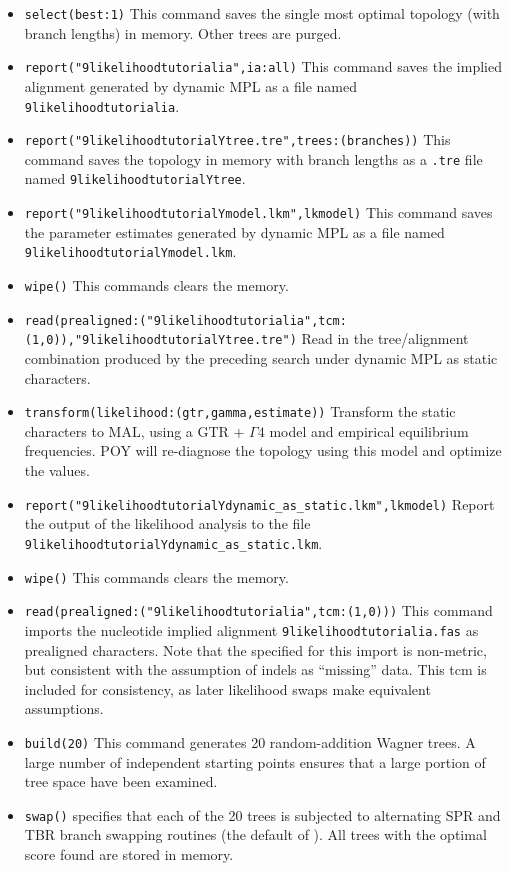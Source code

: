 \begin{itemize}
\item \texttt{select(best:1)} This command saves the single most optimal topology (with branch lengths) in memory. Other trees are purged.
\item \texttt{report("9likelihoodtutorialia",ia:all)} This command saves the implied alignment generated by dynamic MPL as a file named \texttt{9likelihoodtutorialia}.
\item \texttt{report("9likelihoodtutorialYtree.tre",trees:(branches))} This command saves the topology in memory with branch lengths as a \texttt{.tre} file named \texttt{9likelihoodtutorialYtree}.
\item \texttt{report("9likelihoodtutorialYmodel.lkm",lkmodel)} This command saves the parameter estimates generated by dynamic MPL as a file named \texttt{9likelihoodtutorialYmodel.lkm}.
\item \texttt{wipe()} This commands clears the memory.
\item \texttt{read(prealigned:("9likelihoodtutorialia",tcm:(1,0)),"9likelihoodtutorialYtree.tre")} Read in the tree/alignment combination produced by the preceding search under dynamic MPL as static characters.
\item \texttt{transform(likelihood:(gtr,gamma,estimate))} Transform the static characters to MAL, using a GTR + $\Gamma 4$ model and empirical equilibrium frequencies. POY will re-diagnose the topology using this model and optimize the values.
\item \texttt{report("9likelihoodtutorialYdynamic\_as\_static.lkm",lkmodel)} Report the output of the likelihood analysis to the file \texttt{9likelihoodtutorialYdynamic\_as\_static.lkm}.
\item \texttt{wipe()} This commands clears the memory.
\item \texttt{read(prealigned:("9likelihoodtutorialia",tcm:(1,0)))} This command imports the nucleotide implied alignment \texttt{9likelihoodtutorialia.fas} as prealigned characters. Note that the  specified for this import is non-metric, but consistent with the assumption of indels as ``missing'' data. This tcm is included for consistency, as later likelihood swaps make equivalent assumptions.
\item \texttt{build(20)} This command generates 20 random-addition Wagner trees. A large number of independent starting points ensures that a large portion of tree space have been examined.
\item \texttt{swap()}  specifies that each of the 20 trees is subjected to alternating SPR and TBR branch swapping routines (the default of \poy). All trees with the optimal score found are stored in memory.

\end{itemize}

